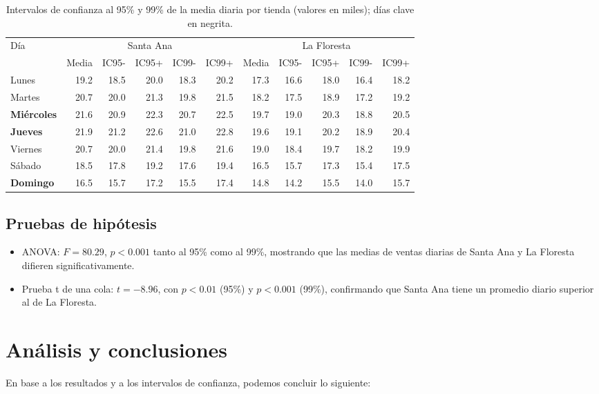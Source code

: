 \documentclass[12pt,a4paper]{article}
\begin{document}
\begin{table}[H]
  \centering
  \small
  \begin{tabular}{l rrrrr | rrrrr}
    \toprule
    Día & \multicolumn{5}{c}{Santa Ana} & \multicolumn{5}{c}{La Floresta}\\
         & Media & IC95- & IC95+ & IC99- & IC99+ & Media & IC95- & IC95+ & IC99- & IC99+\\
    \midrule
    Lunes     & 19.2 & 18.5 & 20.0 & 18.3 & 20.2 & 17.3 & 16.6 & 18.0 & 16.4 & 18.2\\
    Martes    & 20.7 & 20.0 & 21.3 & 19.8 & 21.5 & 18.2 & 17.5 & 18.9 & 17.2 & 19.2\\
    \textbf{Miércoles} & 21.6 & 20.9 & 22.3 & 20.7 & 22.5 & 19.7 & 19.0 & 20.3 & 18.8 & 20.5\\
    \textbf{Jueves}    & 21.9 & 21.2 & 22.6 & 21.0 & 22.8 & 19.6 & 19.1 & 20.2 & 18.9 & 20.4\\
    Viernes   & 20.7 & 20.0 & 21.4 & 19.8 & 21.6 & 19.0 & 18.4 & 19.7 & 18.2 & 19.9\\
    Sábado    & 18.5 & 17.8 & 19.2 & 17.6 & 19.4 & 16.5 & 15.7 & 17.3 & 15.4 & 17.5\\
    \textbf{Domingo}   & 16.5 & 15.7 & 17.2 & 15.5 & 17.4 & 14.8 & 14.2 & 15.5 & 14.0 & 15.7\\
    \bottomrule
  \end{tabular}
  \caption{Intervalos de confianza al 95\% y 99\% de la media diaria por tienda (valores en miles); días clave en negrita.}
  \label{tab:ic_dias}
\end{table}

\subsection{Pruebas de hipótesis}
\begin{itemize}
  \item ANOVA: $F=80.29$, $p<0.001$ tanto al 95\% como al 99\%, mostrando que las medias de ventas diarias de Santa Ana y La Floresta difieren significativamente.
  \item Prueba t de una cola: $t=-8.96$, con $p<0.01$ (95\%) y $p<0.001$ (99\%), confirmando que Santa Ana tiene un promedio diario superior al de La Floresta.
\end{itemize}

\section{Análisis y conclusiones}
En base a los resultados y a los intervalos de confianza, podemos concluir lo siguiente:
\end{document}
